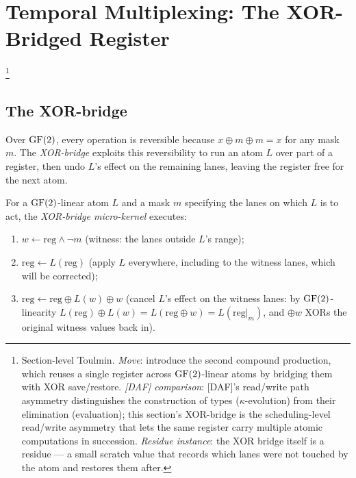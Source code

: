 \section{Temporal Multiplexing: The XOR-Bridged Register}
\label{sec:time-sharing}\footnote{Section-level Toulmin. \emph{Move}: introduce the second compound production, which reuses a single register across $\operatorname{GF}(2)$-linear atoms by bridging them with XOR save/restore. \emph{[DAF] comparison}: [DAF]'s read/write path asymmetry distinguishes the construction of types ($\kappa$-evolution) from their elimination (evaluation); this section's XOR-bridge is the scheduling-level read/write asymmetry that lets the same register carry multiple atomic computations in succession. \emph{Residue instance}: the XOR bridge itself is a residue --- a small scratch value that records which lanes were not touched by the atom and restores them after.}

\subsection{The XOR-bridge}

Over $\operatorname{GF}(2)$, every operation is reversible because
$x \oplus m \oplus m = x$ for any mask $m$. The
\emph{XOR-bridge} exploits this reversibility to run
an atom $L$ over part of a register, then undo $L$'s
effect on the remaining lanes, leaving the register
free for the next atom.

\begin{definition}
  \label{def:xor-bridge}
  For a $\operatorname{GF}(2)$-linear atom $L$ and a mask $m$
  specifying the lanes on which $L$ is to act, the
  \emph{XOR-bridge micro-kernel} executes:
  \begin{enumerate}[nosep,label=(\arabic*)]
    \item $w \leftarrow \mathrm{reg} \wedge \neg m$
      (witness: the lanes outside $L$'s range);
    \item $\mathrm{reg} \leftarrow L(\mathrm{reg})$
      (apply $L$ everywhere, including to the
      witness lanes, which will be corrected);
    \item $\mathrm{reg} \leftarrow \mathrm{reg}
      \oplus L(w) \oplus w$ (cancel $L$'s effect on
      the witness lanes: by $\operatorname{GF}(2)$-linearity
      $L(\mathrm{reg}) \oplus L(w) = L(\mathrm{reg}
      \oplus w) = L(\mathrm{reg}|_m)$, and $\oplus w$
      XORs the original witness values back in).
  \end{enumerate}
\end{definition}

